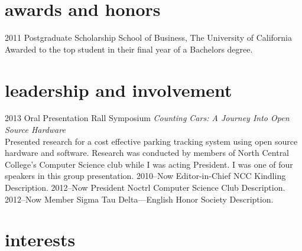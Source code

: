 \documentclass[]{friggeri-cv} %
\begin{document}
\section{awards and honors}

\begin{entrylist}
\entry
{2011}
{Postgraduate Scholarship}
{School of Business, The University of California}
{Awarded to the top student in their final year of a Bachelors degree.}
\end{entrylist}


\section{leadership and involvement}

\begin{entrylist}
\entry
{2013}
{Oral Presentation}
{Rall Symposium}
{\emph{Counting Cars: A Journey Into Open Source Hardware}\\
Presented research for a cost effective parking tracking system using open source hardware and software.
Research was conducted by members of North Central College's Computer Science club while I was acting President. I was one of four speakers in this group presentation.}
\entry
{2010--Now}
{Editor-in-Chief}
{NCC Kindling}
{Description.}
\entry
{2012--Now}
{President}
{Noctrl Computer Science Club}
{Description.}
\entry
{2012--Now}
{Member}
{Sigma Tau Delta---English Honor Society}
{Description.}
\end{entrylist}


\section{interests}
\end{document}
